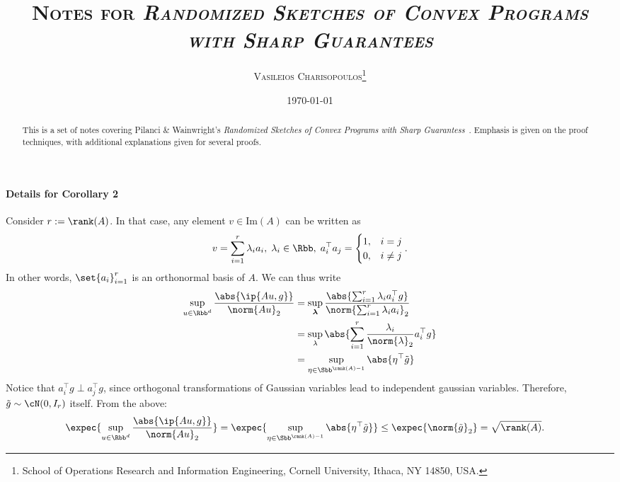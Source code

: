 \documentclass[a4paper]{article}
\begin{document}
\title{\textsc{
	Notes for \textit{Randomized Sketches of Convex Programs with Sharp
	Guarantees}}}
\author{
    \textsc{Vasileios Charisopoulos}\thanks{\quad
        School of Operations Research and Information Engineering, Cornell University,
        Ithaca, NY 14850, USA.
   }}
\date{\today}
\maketitle

\begin{abstract}
This is a set of notes covering Pilanci \& Wainwright's \textit{Randomized
Sketches of Convex Programs with Sharp Guarantess}~\cite{PilWain15}. Emphasis
is given on the proof techniques, with additional explanations given for
several proofs.
\end{abstract}

\paragraph{Details for Corollary 2}
Consider $r := \rank(A)$. In that case, any element $v \in \mathrm{Im}(A)$ can
be written as
\[
    v = \sum_{i=1}^{r} \lambda_i a_i, \; \lambda_i \in \Rbb,
    \; a_i^\top a_j = \begin{cases}
        1, & i = j \\
        0, & i \neq j
    \end{cases}.
\]
In other words, $\set{a_i}_{i=1}^r$ is an orthonormal basis of $A$. We can thus
write
\begin{align*}
    \sup_{u \in \Rbb^d} \frac{\abs{\ip{Au, g}}}{\norm{Au}_2} &=
    \sup_{\bm{\lambda}} \frac{\abs{\sum_{i=1}^r \lambda_i a_i^\top g}}{
        \norm{\sum_{i=1}^r \lambda_i a_i}_2} \\
    &= \sup_{\lambda}
        \abs{\sum_{i=1}^r \frac{\lambda_i}{\norm{\lambda}_2} a_i^\top g} \\
    &= \sup_{\eta \in \Sbb^{\rank(A) - 1}} \abs{\eta^\top \tilde{g}}
\end{align*}
Notice that $a_i^\top g \perp a_j^\top g$, since orthogonal transformations of
Gaussian variables lead to independent gaussian variables. Therefore,
$\tilde{g} \sim \cN(0, I_r)$ itself. From the above:
\begin{align*}
    \expec{\sup_{u \in \Rbb^d} \frac{\abs{\ip{Au, g}}}{\norm{Au}_2}} &=
    \expec{\sup_{\eta \in \Sbb^{\rank(A) - 1}} \abs{\eta^\top \tilde{g}}} \leq
    \expec{\norm{\tilde{g}}_2} =
    \sqrt{\rank(A)}.
\end{align*}
\end{document}
